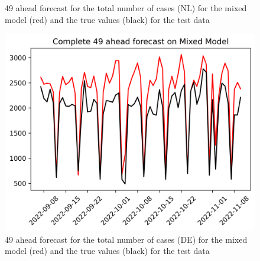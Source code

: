 \begin{figure}
\begin{minipage}{.32\textwidth}
  \caption{49 ahead forecast for the total number of cases (NL) for the mixed model (red) and the true values (black) for the test data}
  \label{fig:tot_cases_fc_49_mix}
\end{minipage}
\begin{minipage}{.32\textwidth}
  \centering
  \includegraphics[width=\linewidth]{pics/49_ah/DE_Complete_49_ahead_Mixed Model.png}
  \caption{49 ahead forecast for the total number of cases (DE) for the mixed model (red) and the true values (black) for the test data}
  \label{fig:tot_cases_fc_49_mix_DE}
\end{minipage}

\end{figure}
